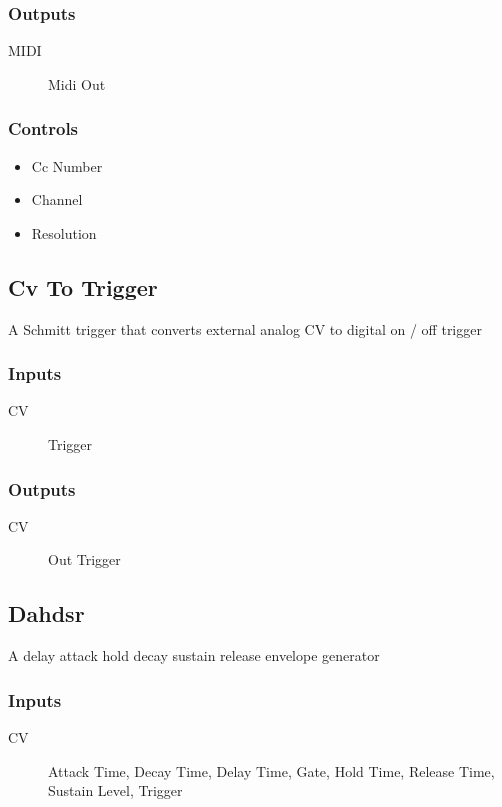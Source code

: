 \subsubsection{Outputs}
\begin{description}
\item [MIDI] Midi Out
\end{description}

\subsubsection{Controls}
\begin{itemize}
\item Cc Number
\item Channel
\item Resolution
\end{itemize}

\subsection{Cv To Trigger}

A Schmitt trigger that converts external analog CV to digital on / off trigger



\subsubsection{Inputs}
\begin{description}
\item [CV] Trigger
\end{description}

\subsubsection{Outputs}
\begin{description}
\item [CV] Out Trigger
\end{description}

\subsection{Dahdsr}

A delay attack hold decay sustain release envelope generator



\subsubsection{Inputs}
\begin{description}
\item [CV] Attack Time, Decay Time, Delay Time, Gate, Hold Time, Release Time, Sustain Level, Trigger
\end{description}

